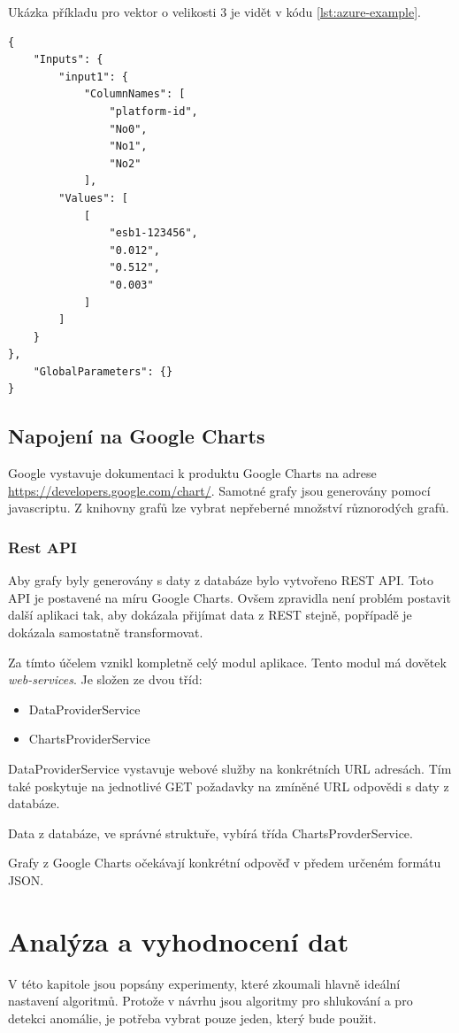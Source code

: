 \documentclass[thesis=M,czech]{FITthesis}[2012/10/20]
\begin{document}
		Ukázka příkladu pro vektor o velikosti 3 je vidět v kódu \ref{lst:azure-example}.
		
		
			\begin{lstlisting}[caption={Požadavek na webovou službu Azure ML}, label={lst:azure-example}]
{
	"Inputs": {
		"input1": {
			"ColumnNames": [
				"platform-id",
				"No0",
				"No1",
				"No2"
			],
		"Values": [
			[
				"esb1-123456",
				"0.012",
				"0.512",
				"0.003"
			]
		]
	}
},
	"GlobalParameters": {}
}
			\end{lstlisting}
	
					

		
	\section{Napojení na Google Charts}
		Google vystavuje dokumentaci k produktu Google Charts na adrese \url{https://developers.google.com/chart/}. Samotné grafy jsou generovány pomocí javascriptu. Z knihovny grafů lze vybrat nepřeberné množství různorodých grafů. 
		
		\subsection{Rest API}
			Aby grafy byly generovány s daty z databáze bylo vytvořeno REST API. Toto API je postavené na míru Google Charts. Ovšem zpravidla není problém postavit další aplikaci tak, aby dokázala přijímat data z REST stejně, popřípadě je dokázala samostatně transformovat.
		
			Za tímto účelem vznikl kompletně celý modul aplikace. Tento modul má dovětek \textit{web-services}. Je složen ze dvou tříd:
		
		\begin{itemize} 
			\item DataProviderService
			\item ChartsProviderService			
		\end{itemize}
		
		DataProviderService vystavuje webové služby na konkrétních URL adresách. Tím také poskytuje na jednotlivé GET požadavky na zmíněné URL odpovědi s daty z databáze. 
		
		Data z databáze, ve správné struktuře, vybírá třída ChartsProvderService.
		
		Grafy z Google Charts očekávají konkrétní odpověď v předem určeném formátu JSON.

\chapter{Analýza a vyhodnocení dat}
	\label{chap:analyse}
	V této kapitole jsou popsány experimenty, které zkoumali hlavně ideální nastavení algoritmů. Protože v návrhu jsou algoritmy pro shlukování a pro detekci anomálie, je potřeba vybrat pouze jeden, který bude použit.
	
\end{document}
